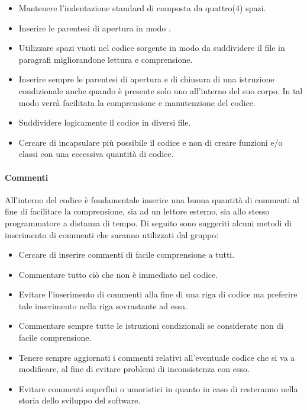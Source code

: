 \begin{itemize}
\item Mantenere l'indentazione standard di  composta da quattro(4) spazi.

\item Inserire le parentesi di apertura in modo .

\item Utilizzare spazi vuoti nel codice sorgente in modo da suddividere il file in paragrafi migliorandone lettura e comprensione.

\item Inserire sempre le parentesi di apertura e di chiusura di una istruzione condizionale anche quando è presente solo uno  all'interno del suo corpo. In tal modo verrà facilitata la comprensione e manutenzione del codice.

\item Suddividere logicamente il codice in diversi file.

\item Cercare di incapsulare più possibile il codice e non di creare funzioni e/o classi con una eccessiva quantità di codice.
\end{itemize}

\paragraph{Commenti}
All'interno del codice è fondamentale inserire una buona quantità di commenti al fine di facilitare la comprensione, sia ad un lettore esterno, sia allo stesso programmatore a distanza di tempo.
Di seguito sono suggeriti alcuni metodi di inserimento di commenti che saranno utilizzati dal gruppo:

\begin{itemize}
\item Cercare di inserire commenti di facile comprensione a tutti.

\item Commentare tutto ciò che non è immediato nel codice.

\item Evitare l'inserimento di commenti alla fine di una riga di codice ma preferire tale inserimento nella riga sovrastante ad essa.

\item Commentare sempre tutte le istruzioni condizionali se considerate non di facile comprensione.

\item Tenere sempre aggiornati i commenti relativi all'eventuale codice che si va a modificare, al fine di evitare problemi di inconsistenza con esso.

\item Evitare commenti superflui o umoristici in quanto in caso di  resteranno nella storia dello sviluppo del software.
\end{itemize}

